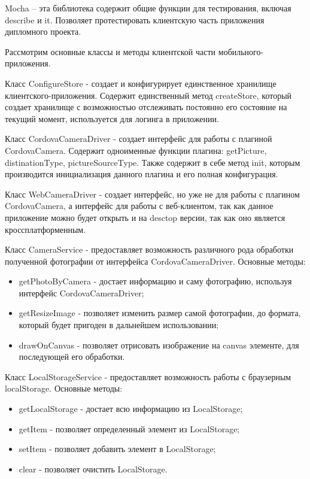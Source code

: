 Mocha – эта библиотека содержит общие функции для тестирования, включая describe и it. Позволяет протестировать клиентскую часть приложения дипломного проекта.

Рассмотрим основные классы и методы клиентской части мобильного-приложения.

Класс ConfigureStore - создает и конфигурирует единственное хранилище клиентского-приложения. Содержит единственный метод createStore, который создает хранилище с возможностью отслеживать постоянно его состояние на текущий момент, используется для логинга в приложении.

Класс CordovaCameraDriver - создает интерфейс для работы с плагиной CordovaCamera. Содержит одноименные функции плагина: getPicture, distinationType, pictureSourceType. Также содержит в себе метод init, которым производится инициализация данного плагина и его полная конфигурация.

Класс WebCameraDriver - создает интерфейс, но уже не для работы с плагином CordovaCamera, а интерфейс для работы с веб-клиентом, так как данное приложение можно будет открыть и на desctop версии, так как оно является кроссплатформенным.

Класс CameraService - предоставляет возможность различного рода обработки полученной фотографии от интерфейса CordovaCameraDriver. Основные методы:
\begin{itemize}
  \item getPhotoByCamera - достает информацию и саму фотографию, используя интерфейс CordovaCameraDriver;
  \item getResizeImage - позволяет изменить размер самой фотографии, до формата, который будет пригоден в дальнейшем использовании;
  \item drawOnCanvas - позволяет отрисовать изображение на canvas элементе, для последующей его обработки.
\end{itemize}

Класс LocalStorageService - предоставляет возможность работы с браузерным localStorage. Основные методы:
\begin{itemize}
  \item getLocalStorage - достает всю информацию из LocalStorage;
  \item getItem - позволяет определенный элемент из LocalStorage;
  \item setItem - позволяет добавить элемент в LocalStorage;
  \item clear - позволяет очистить LocalStorage.
\end{itemize}

